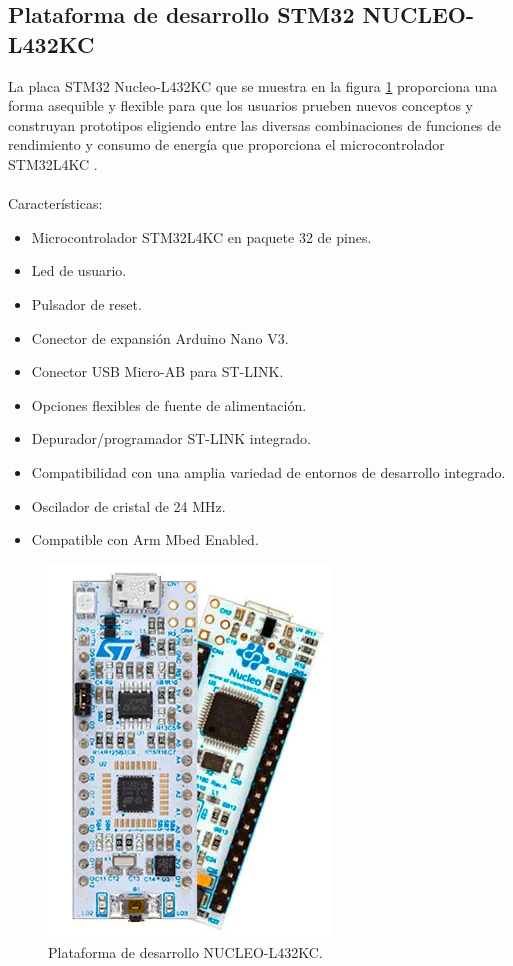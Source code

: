 \subsection{Plataforma de desarrollo STM32 NUCLEO-L432KC}
La placa STM32 Nucleo-L432KC que se muestra en la figura \ref{fig:nucleol432kc} proporciona una forma asequible y flexible para que los usuarios prueben nuevos conceptos y construyan prototipos eligiendo entre las diversas combinaciones de funciones de rendimiento y consumo de energía que proporciona el microcontrolador STM32L4KC \citep{NUCLEOL432KC}.
\\ 
\\ Características:
\begin{itemize}
	\item Microcontrolador STM32L4KC en paquete 32 de pines.
	\item Led de usuario.
	\item Pulsador de reset.
	\item Conector de expansión Arduino Nano V3.
	\item Conector USB Micro-AB para ST-LINK.
	\item Opciones flexibles de fuente de alimentación.
	\item Depurador/programador ST-LINK integrado.
	\item Compatibilidad con una amplia variedad de entornos de desarrollo integrado.
	\item Oscilador de cristal de 24 MHz.
	\item Compatible con Arm Mbed Enabled.  
\end{itemize}
\begin{figure}[htbp]
	\centering
	\includegraphics[width=.35\textwidth]{./Figures/nucleo-l432kc.jpg}
	\caption{Plataforma de desarrollo NUCLEO-L432KC.}
	\label{fig:nucleol432kc}
\end{figure}
\vspace{5cm}

